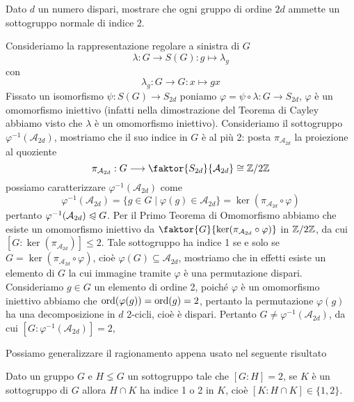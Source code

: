 \documentclass[11pt]{scrartcl}
\begin{document}
\begin{exercise}
    \label{ex1.48}
    Dato $d$ un numero dispari, mostrare che ogni gruppo di ordine $2d$ ammette
    un sottogruppo normale di indice 2.
\end{exercise}

\begin{soln}
    Consideriamo la rappresentazione regolare a sinistra di $G$
    \[
        \lambda: G \longrightarrow S(G) : g\longmapsto \lambda_g
    \]
    con
    \[
        \lambda_g : G\longrightarrow G : x\longmapsto gx
    \]
    Fissato un isomorfismo $\psi: S(G) \longrightarrow S_{2d}$ poniamo
    $\varphi = \psi\circ\lambda :G\longrightarrow S_{2d}$, $\varphi$ è 
    un omomorfismo iniettivo (infatti nella dimostrazione del Teorema di Cayley
    abbiamo visto che $\lambda$ è un omomorfismo iniettivo). Consideriamo 
    il sottogruppo $\varphi^{-1}(\mathcal{A}_{2d})$, mostriamo che il suo 
    indice in $G$ è al più 2:
    posta $\pi_{\mathcal{A}_{2d}}$ la proiezione al quoziente
    \[
        \pi_{\mathcal{A}_{2d}}:G\longrightarrow \faktor{S_{2d}}{\mathcal{A}_{2d}}\cong \Z2
    \]
    possiamo caratterizzare $\varphi^{-1}(\mathcal{A}_{2d})$ come
    \[
        \varphi^{-1}(\mathcal{A}_{2d}) = \{g \in G \mid \varphi(g) \in \mathcal{A}_{2d}\}
        = \ker (\pi_{\mathcal{A}_{2d}}\circ\varphi)
    \]
    pertanto $\varphi^{-1}(\mathcal{A}_{2d})\trianglelefteqslant G$. 
    Per il Primo Teorema di Omomorfismo abbiamo che esiste un omomorfismo
    iniettivo da $\faktor{G}{\ker(\pi_{\mathcal{A}_{2d}}\circ\varphi)}$ in
    $\mathbb{Z}/{2}\mathbb{Z}$, da cui $[G:\ker(\pi_{\mathcal{A}_{2d}})] \leq 2$. Tale 
    sottogruppo ha indice 1 se e solo se $G = \ker(\pi_{\mathcal{A}_{2d}}\circ\varphi)$,
    cioè $\varphi(G) \subseteq \mathcal{A}_{2d}$, mostriamo che in effetti esiste 
    un elemento di $G$ la cui immagine tramite $\varphi$ è una permutazione 
    dispari. Consideriamo $g \in G$ un elemento di ordine 2, poiché $\varphi$
    è un omomorfismo iniettivo abbiamo che $\operatorname{ord}(\varphi(g)) = \operatorname{ord}(g) = 2$,
    pertanto la permutazione $\varphi(g)$ ha una decomposizione in $d$ 2-cicli,
    cioè è dispari. Pertanto $G \neq \varphi^{-1}(\mathcal{A}_{2d})$,
    da cui $[G: \varphi^{-1}(\mathcal{A}_{2d})] = 2$,
\end{soln}

Possiamo generalizzare il ragionamento appena usato nel seguente risultato

\begin{proposition}
    \label{prop1.49}
    Dato un gruppo $G$ e $H\lneq G$ un sottogruppo tale che $[G:H] = 2$, se
    $K$ è un sottogruppo di $G$ allora $H\cap K$ ha indice 1 o 2 in $K$,
    cioè $[K:H\cap K] \in \{1, 2\}$.
\end{proposition}
\end{document}

